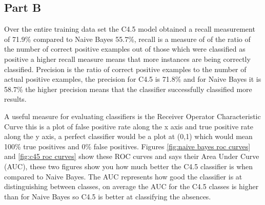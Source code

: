 \documentclass[10pt]{article}
\begin{document}
\newpage
\subsection*{Part B}
Over the entire training data set the C4.5 model obtained a recall measurement of 71.9\% compared to Naive Bayes 55.7\%, recall is a measure of of the ratio of the number of correct positive examples out of those which were classified as positive\cite{MarslandStephen2015Ml:a} a higher recall measure means that more instances are being correctly classified. Precision is the ratio of correct positive examples to the number of actual positive examples\cite{MarslandStephen2015Ml:a}, the precision for C4.5 is 71.8\% and for Naive Bayes it is 58.7\% the higher precision means that the classifier successfully classified more results. 

A useful measure for evaluating classifiers is the Receiver Operator Characteristic Curve this is a plot of false positive rate along the x axis and true positive rate along the y axis, a perfect classifier would be a plot at (0,1) which would mean 100\% true positives and 0\% false positives. Figures \ref{fig:naive bayes roc curves} and \ref{fig:c45 roc curves} show these ROC curves and says their Area Under Curve (AUC), these two figures show you how much better the C4.5 classifier is when compared to Naive Bayes. The AUC represents how good the classifier is at distinguishing between classes, on average the AUC for the C4.5 classes is higher than for Naive Bayes so C4.5 is better at classifying the absences. 
\end{document}
